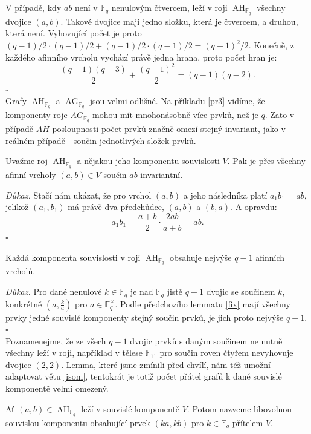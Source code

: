 \documentclass[12pt]{report}
\DeclareMathOperator{\AG}{AG}
\DeclareMathOperator{\AH}{AH}
\begin{document}
V případě, kdy $ab$ není v $\mathbb{F}_q$ nenulovým čtvercem, leží v roji $\AH_{\mathbb{F}_q}$ všechny dvojice $(a,b)$. Takové dvojice mají jedno složku, která je čtvercem, a druhou, která není. Vyhovující počet je proto $(q-1)/2 \cdot (q-1)/2 + (q-1)/2 \cdot (q-1)/2 = (q-1)^2/2$. Konečně, z každého afinního vrcholu vychází právě jedna hrana, proto počet hran je:
$$\frac{(q-1)(q-3)}{2}+\frac{(q-1)^2}{2} = (q-1)(q-2).$$  \hfill $\square$\\



Grafy $\AH_{\mathbb{F}_q}$ a $\AG_{\mathbb{F}_q}$ jsou velmi odlišné. Na příkladu \ref{pr3} vidíme, že komponenty roje $AG_{\mathbb{F}_q}$ mohou mít mnohonásobně více prvků, než je $q$. Zato v případě $AH$ posloupnosti počet prvků značně omezí stejný invariant, jako v reálném případě - součin jednotlivých složek prvků. 

\begin{lemma}\label{fix}
Uvažme roj $\AH_{\mathbb{F}_q}$ a nějakou jeho komponentu souvislosti $V$. Pak je přes všechny afinní vrcholy $(a,b) \in V$ součin $ab$ invariantní.
\end{lemma}
\noindent \textit{Důkaz.} Stačí nám ukázat, že pro vrchol $(a,b)$ a jeho následníka platí $a_1 b_1 = ab$, jelikož $(a_1,b_1)$ má právě dva předchůdce, $(a,b)$ a $(b,a)$. A opravdu:
\begin{equation*}
a_1 b_1 = \frac{a+b}{2} \cdot \frac{2ab}{a+b} = ab.
\end{equation*} 
\hfill $\square$\\

\begin{dusledek}\label{fixab}
Každá komponenta souvislosti v roji $\AH_{\mathbb{F}_q}$ obsahuje nejvýše $q-1$ afinních vrcholů.
\end{dusledek}
\noindent \textit{Důkaz.} Pro dané nenulové $k \in \mathbb{F}_q$ je nad $\mathbb{F}_q$ jistě $q-1$ dvojic se součinem $k$, konkrétně $\left(a, \frac{k}{a}\right)$ pro $a \in \mathbb{F}_q ^{\times}$. Podle předchozího lemmatu \ref{fix} mají všechny prvky jedné souvislé komponenty stejný součin prvků, je jich proto nejvýše $q-1$. \hfill $\square$\\

Poznamenejme, že ze všech $q-1$ dvojic prvků s daným součinem ne nutně všechny leží v roji, například v tělese $\mathbb{F}_{11}$ pro součin roven čtyřem nevyhovuje dvojice $(2,2)$. Lemma, které jsme zmínili před chvílí, nám též umožní adaptovat větu \ref{isom}, tentokrát je totiž počet přátel grafů k dané souvislé komponentě velmi omezený.
\begin{definice}
Ať $(a,b) \in \AH_{\mathbb{F}_q}$ leží v souvislé komponentě $V$. Potom nazveme libovolnou souvislou komponentu obsahující prvek $(ka,kb)$ pro $k \in \mathbb{F}_q$ přítelem $V$.
\end{definice}
\end{document}
